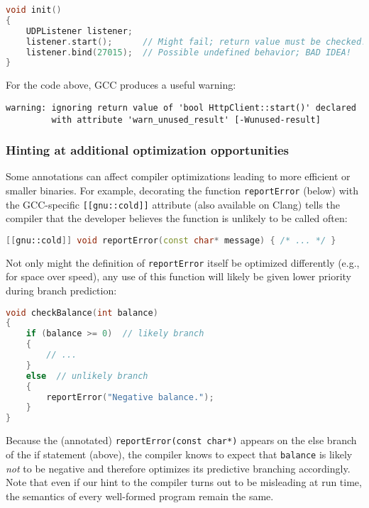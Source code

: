 \begin{lstlisting}[language=C++]
void init()
{
    UDPListener listener;
    listener.start();      // Might fail; return value must be checked!
    listener.bind(27015);  // Possible undefined behavior; BAD IDEA!
}
\end{lstlisting}
    
\noindent For the code above, GCC produces a useful warning:

\begin{lstlisting}[style=plain]
warning: ignoring return value of 'bool HttpClient::start()' declared
         with attribute 'warn_unused_result' [-Wunused-result]
\end{lstlisting}
    

\subsubsection[Hinting at additional optimization opportunities]{Hinting at additional optimization opportunities}\label{hinting-at-additional-optimization-opportunities}

Some annotations can affect compiler optimizations leading to more
efficient or smaller binaries. For example, decorating the function
\texttt{reportError} (below) with the GCC-specific
\texttt{[[gnu::cold]]} attribute (also available on Clang) tells the
compiler that the developer believes the function is unlikely to be
called often:

\begin{lstlisting}[language=C++]
[[gnu::cold]] void reportError(const char* message) { /* ... */ }
\end{lstlisting}
    
\noindent Not only might the definition of \texttt{reportError} itself be
optimized differently (e.g., for space over speed), any use of this
function will likely be given lower priority during branch \mbox{prediction}:

\begin{lstlisting}[language=C++]
void checkBalance(int balance)
{
    if (balance >= 0)  // likely branch
    {
        // ...
    }
    else  // unlikely branch
    {
        reportError("Negative balance.");
    }
}
\end{lstlisting}
 \pagebreak%
    
\noindent Because the (annotated) \texttt{reportError(const}~\texttt{char*)}
appears on the else branch of the if statement (above), the compiler 
knows to expect that \texttt{balance} is likely \emph{not} to be
negative and therefore optimizes its predictive branching accordingly.
Note that even if our hint to the compiler turns out to be misleading at
run time, the semantics of every well-formed program remain the same.


